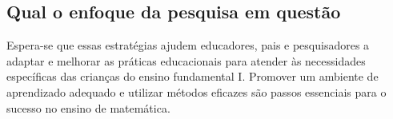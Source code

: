 \subsection{Qual o enfoque da pesquisa em questão}

Espera-se que essas estratégias ajudem educadores, pais e pesquisadores a adaptar e melhorar as práticas educacionais para atender às necessidades específicas das crianças do ensino fundamental I. Promover um ambiente de aprendizado adequado e utilizar métodos eficazes são passos essenciais para o sucesso no ensino de matemática. 













